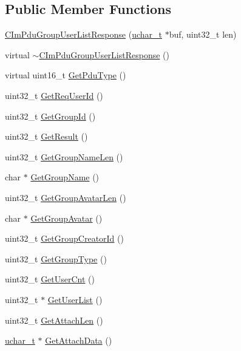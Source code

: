 \subsection*{Public Member Functions}
\begin{DoxyCompactItemize}
\item 
\hyperlink{class_c_im_pdu_group_user_list_response_af8a758d2036975117c641e7a36e50342}{C\+Im\+Pdu\+Group\+User\+List\+Response} (\hyperlink{base_2ostype_8h_a124ea0f8f4a23a0a286b5582137f0b8d}{uchar\+\_\+t} $\ast$buf, uint32\+\_\+t len)
\item 
virtual \hyperlink{class_c_im_pdu_group_user_list_response_ade30f042aa23ed02725c235926113002}{$\sim$\+C\+Im\+Pdu\+Group\+User\+List\+Response} ()
\item 
virtual uint16\+\_\+t \hyperlink{class_c_im_pdu_group_user_list_response_a1727a0e28d32d34404868e00a362b761}{Get\+Pdu\+Type} ()
\item 
uint32\+\_\+t \hyperlink{class_c_im_pdu_group_user_list_response_a718e23ccae1f3fea2be0c7f315e9d711}{Get\+Req\+User\+Id} ()
\item 
uint32\+\_\+t \hyperlink{class_c_im_pdu_group_user_list_response_a05e2ce310171bd141b360e493a8fbce3}{Get\+Group\+Id} ()
\item 
uint32\+\_\+t \hyperlink{class_c_im_pdu_group_user_list_response_aafb93a4c4b4561fbc4f8c832d9c16869}{Get\+Result} ()
\item 
uint32\+\_\+t \hyperlink{class_c_im_pdu_group_user_list_response_a94038b67e9e7d38667b0b532aaa0a84c}{Get\+Group\+Name\+Len} ()
\item 
char $\ast$ \hyperlink{class_c_im_pdu_group_user_list_response_a9adc8068b3fca71f85fdfe8c63268574}{Get\+Group\+Name} ()
\item 
uint32\+\_\+t \hyperlink{class_c_im_pdu_group_user_list_response_aabb79537e807bd57e72880c43ae0c07e}{Get\+Group\+Avatar\+Len} ()
\item 
char $\ast$ \hyperlink{class_c_im_pdu_group_user_list_response_af2f87492dfe3f505f091a6ccb2c16de1}{Get\+Group\+Avatar} ()
\item 
uint32\+\_\+t \hyperlink{class_c_im_pdu_group_user_list_response_a2c73d6129afb3fa9994444ddee5f1b4a}{Get\+Group\+Creator\+Id} ()
\item 
uint32\+\_\+t \hyperlink{class_c_im_pdu_group_user_list_response_a2148617410ea7408de1a88a0c4ee981d}{Get\+Group\+Type} ()
\item 
uint32\+\_\+t \hyperlink{class_c_im_pdu_group_user_list_response_a42b4d9bad7daeaffc8be8956c42f015c}{Get\+User\+Cnt} ()
\item 
uint32\+\_\+t $\ast$ \hyperlink{class_c_im_pdu_group_user_list_response_a5e9d910a8a04680beacfa8be5c861067}{Get\+User\+List} ()
\item 
uint32\+\_\+t \hyperlink{class_c_im_pdu_group_user_list_response_a318e94b62a1106d71c9c3a65a2107bae}{Get\+Attach\+Len} ()
\item 
\hyperlink{base_2ostype_8h_a124ea0f8f4a23a0a286b5582137f0b8d}{uchar\+\_\+t} $\ast$ \hyperlink{class_c_im_pdu_group_user_list_response_a09e875860bb54bb8c6d6980a266173ae}{Get\+Attach\+Data} ()
\end{DoxyCompactItemize}
